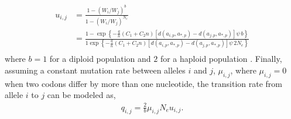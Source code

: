 \documentclass{article}
\newcommand{\Ne}{\ensuremath{{N_e}}\xspace} %
\newcommand{\aip}{\ensuremath{a_{i,p}}\xspace}
\newcommand{\ajp}{\ensuremath{a_{j,p}}\xspace}
\newcommand{\aoptp}{\ensuremath{a_{*,p}}\xspace}
\newcommand{\cveci}{\ensuremath{\cvec_i}\xspace}
\newcommand{\cvecj}{\ensuremath{\cvec_j}\xspace}
\newcommand{\cvec}{\ensuremath{\Vec{c}}\xspace}
\newcommand{\kmax}{\ensuremath{{k_{\max}}}\xspace}
\newcommand{\muij}{\ensuremath{\mu_{i,j}}\xspace}
\begin{document}
\begin{align*}
  u_{i,j} &=  \frac{1 - \left(W_i/W_j\right)^b}{1 - \left(W_i/W_j\right)^\Ne}\\
   &= \frac{1- \exp\left\{- \frac{q}{n} \left(C_1 + C_2 n\right) \left[d\left(\aip,\aoptp\right) - d\left(\ajp,\aoptp\right)\right] \psi \,  b\right\}}  {1\exp\left\{- \frac{q}{n} \left(C_1 + C_2 n\right) \left[d\left(\aip,\aoptp\right) - d\left(\ajp,\aoptp\right)\right] \psi \, 2\Ne\right\}}\\
\end{align*}
where $b=1$ for a diploid population and $2$ for a haploid population \citep{Kimura1962,Wright1969,Iwasa1988,BergAndLassig2003,SellaAndHirsh2005}.
Finally, assuming a constant mutation rate between alleles $i$ and $j$, $\muij$, where $\muij = 0$ when two codons differ by more than one nucleotide, the transition rate from allele $i$ to $j$ can be modeled as,
\begin{align*}
  q_{i,j} = \frac{2}{b} \muij \Ne u_{i,j}.
\end{align*}
\end{document}
